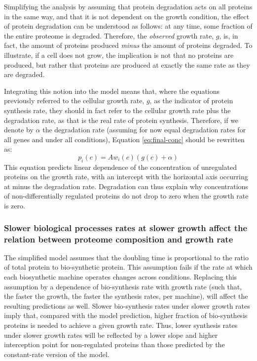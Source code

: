 \documentclass[a4paper]{article}
\begin{document}
Simplifying the analysis by assuming that protein degradation acts on all proteins in the same way, and that it is not dependent on the growth condition, the effect of protein degradation can be understood as follows: at any time, some fraction of the entire proteome is degraded.
Therefore, the \emph{observed} growth rate, $g$, is, in fact, the amount of proteins produced \emph{minus} the amount of proteins degraded.
To illustrate, if a cell does not grow, the implication is not that no proteins are produced, but rather that proteins are produced at exactly the same rate as they are degraded.

Integrating this notion into the model means that, where the equations previously referred to the cellular growth rate, $g$, as the indicator of protein synthesis rate, they should in fact refer to the cellular growth rate plus the degradation rate, as that is the real rate of protein synthesis.
Therefore, if we denote by $\alpha$ the degradation rate (assuming for now equal degradation rates for all genes and under all conditions), Equation \ref{eq:final-conc} should be rewritten as:
\begin{equation}
  \label{eq:final-conc-deg}
  p_i(c)=Aw_i(c)(g(c)+\alpha)
\end{equation}
This equation predicts linear dependence of the concentration of unregulated proteins on the growth rate, with an intercept with the horizontal axis occurring at minus the degradation rate.
Degradation can thus explain why concentrations of non-differentially regulated proteins do not drop to zero when the growth rate is zero.

\subsubsection{Slower biological processes rates at slower growth affect the relation between proteome composition and growth rate}
The simplified model assumes that the doubling time is proportional to the ratio of total protein to bio-synthetic protein.
This assumption fails if the rate at which each biosynthetic machine operates changes across conditions.
Replacing this assumption by a dependence of bio-synthesis rate with growth rate (such that, the faster the growth, the faster the synthesis rates, per machine), will affect the resulting predictions as well.
Slower bio-synthesis rates under slower growth rates imply that, compared with the model prediction, higher fraction of bio-synthesis proteins is needed to achieve a given growth rate.
Thus, lower synthesis rates under slower growth rates will be reflected by a lower slope and higher interception point for non-regulated proteins than those predicted by the constant-rate version of the model.
\end{document}
